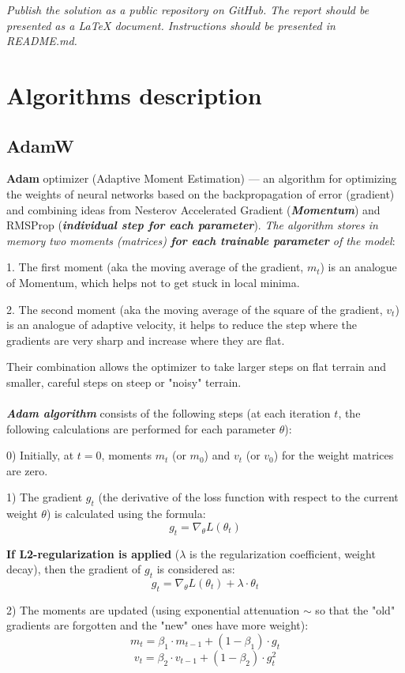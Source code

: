 \documentclass{report}
\begin{document}
\textit{Publish the solution as a public repository on GitHub. The report should be presented as a LaTeX document. Instructions should be presented in README.md.}


\chapter{Algorithms description}
\section{AdamW}
\textbf{Adam} optimizer (Adaptive Moment Estimation) — an algorithm for optimizing the weights of neural networks based on the backpropagation of error (gradient) and combining ideas from Nesterov Accelerated Gradient (\textit{\textbf{Momentum}}) and RMSProp (\textit{\textbf{individual step for each parameter}}). \textit{The algorithm stores in memory two moments (matrices) \textbf{for each trainable parameter} of the model}:

1. The first moment (aka the moving average of the gradient, $m_t$) is an analogue of Momentum, which helps not to get stuck in local minima.

2. The second moment (aka the moving average of the square of the gradient, $v_t$) is an analogue of adaptive velocity, it helps to reduce the step where the gradients are very sharp and increase where they are flat.

Their combination allows the optimizer to take larger steps on flat terrain and smaller, careful steps on steep or "noisy" terrain.
\\\\
\textit{\textbf{Adam algorithm}} consists of the following steps (at each iteration $t$, the following calculations are performed for each parameter $\theta$):

0) Initially, at $t=0$, moments $m_t$ (or $m_0$) and $v_t$ (or $v_0$) for the weight matrices are zero.

1) The gradient $g_t$ (the derivative of the loss function with respect to the current weight $\theta$) is calculated using the formula:
    $$g_t = \nabla_{\theta}L(\theta_t)$$

        \textbf{If L2-regularization is applied} ($\lambda$ is the regularization coefficient, weight decay), then the gradient of $g_t$ is considered as:
    $$g_t = \nabla_{\theta}L(\theta_t) + \lambda \cdot \theta_{t}$$
    
2) The moments are updated (using exponential attenuation $\sim$ so that the "old" gradients are forgotten and the "new" ones have more weight):
    $$m_t = \beta_1 \cdot m_{t-1} + (1 - \beta_1) \cdot g_t$$
    $$v_t = \beta_2 \cdot v_{t-1} + (1 - \beta_2) \cdot g_t^2$$
\end{document}
